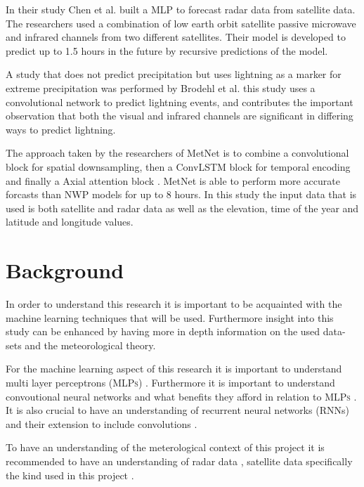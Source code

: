 \documentclass[acmtog, authorversion]{acmart}
\begin{document}
In their study Chen et al. built a \cite{precipitationEstimationFromSat} MLP to forecast radar data from satellite data. The researchers used a combination of low earth orbit satellite passive microwave and infrared channels from two different satellites. Their model is developed to predict up to 1.5 hours in the future by recursive predictions of the model.
\medskip

A study that does not predict precipitation but uses lightning as a marker for extreme precipitation was performed by Brodehl et al. \cite{predictionLightning} this study uses a convolutional network to predict lightning events, and contributes the important observation that both the visual and infrared channels are significant in differing ways to predict lightning.
\medskip

The approach taken by the researchers of MetNet \cite{sønderby2020metnet} is to combine a convolutional block for spatial downsampling, then a ConvLSTM block for temporal encoding and finally a Axial attention block \cite{vaswani2017attention}. MetNet is able to perform more accurate forcasts than NWP models for up to 8 hours. In this study the input data that is used is both satellite and radar data as well as the elevation, time of the year and latitude and longitude values.

\section{Background}
In order to understand this research it is important to be acquainted with the machine learning techniques that will be used. Furthermore insight into this study can be enhanced by having more in depth information on the used data-sets and the meteorological theory.
\medskip

For the machine learning aspect of this research it is important to understand multi layer perceptrons (\textsc{MLPs}) \cite{schmidhuber2022annotated}. Furthermore it is important to understand convoutional neural networks and what benefits they afford in relation to \textsc{MLPs} \cite{oshea2015introduction}. It is also crucial to have an understanding of recurrent neural networks (RNNs) and their extension to include convolutions \cite{convlstm}.
\medskip

To have an understanding of the meterological context of this project it is recommended to have an understanding of radar data \cite{rinehart1991radar}, satellite data specifically the kind used in this project \cite{schmid-no-date}.
\end{document}
